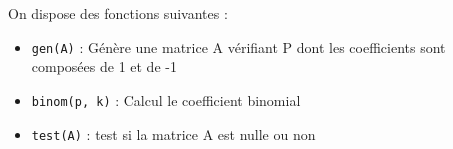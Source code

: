 \noindent On dispose des fonctions suivantes :
\begin{itemize}
  \item \lstinline {gen(A)} : Génère une matrice A vérifiant P dont les coefficients sont composées de 1 et de -1 \\
  \item \lstinline {binom(p, k)} : Calcul le coefficient binomial \\
  \item \lstinline {test(A)} : test si la matrice A est nulle ou non \\
\end{itemize}
